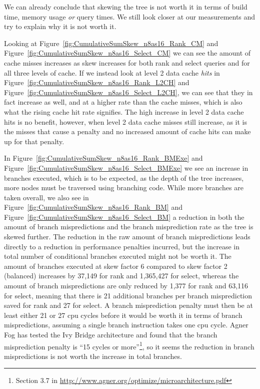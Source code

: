 We can already conclude that skewing the tree is not worth it in terms of build time, memory usage \textit{or} query times.
We still look closer at our measurements and try to explain why it is not worth it.

Looking at Figure~\ref{fig:CumulativeSumSkew_n8as16_Rank_CM} and Figure~\ref{fig:CumulativeSumSkew_n8as16_Select_CM} we can see the amount of cache misses increases as skew increases for both rank and select queries and for all three levels of cache.
If we instead look at level 2 data cache \textit{hits} in Figure~\ref{fig:CumulativeSumSkew_n8as16_Rank_L2CH} and Figure~\ref{fig:CumulativeSumSkew_n8as16_Select_L2CH}, we can see that they in fact increase as well, and at a higher rate than the cache misses, which is also what the rising cache hit rate signifies.
The high increase in level 2 data cache hits is no benefit, however, when level 2 data cache misses still increase, as it is the misses that cause a penalty and no increased amount of cache hits can make up for that penalty.

In Figure~\ref{fig:CumulativeSumSkew_n8as16_Rank_BMExe} and Figure~\ref{fig:CumulativeSumSkew_n8as16_Select_BMExe} we see an increase in branches executed, which is to be expected, as the depth of the tree increases, more nodes must be traversed using branching code.
While more branches are taken overall, we also see in Figure~\ref{fig:CumulativeSumSkew_n8as16_Rank_BM} and Figure~\ref{fig:CumulativeSumSkew_n8as16_Select_BM} a reduction in both the amount of branch mispredictions and the branch misprediction rate as the tree is skewed further.
The reduction in the raw amount of branch mispredictions leads directly to a reduction in performance penalties incurred, but the increase in total number of conditional branches executed might not be worth it.
The amount of branches executed at skew factor 6 compared to skew factor 2 (balanced) increases by 37,149 for rank and 1,365,427 for select, whereas the amount of branch mispredictions are only reduced by 1,377 for rank and 63,116 for select, meaning that there is 21 additional branches per branch misprediction saved for rank and 27 for select.
A branch misprediction penalty must then be at least either 21 or 27 cpu cycles before it would be worth it in terms of branch mispredictions, assuming a single branch instruction takes one cpu cycle.
Agner Fog has tested the Ivy Bridge architecture and found that the branch misprediction penalty is “15 cycles or more”\footnote{Section 3.7 in \url{http://www.agner.org/optimize/microarchitecture.pdf}}, so it seems the reduction in branch mispredictions is not worth the increase in total branches.

